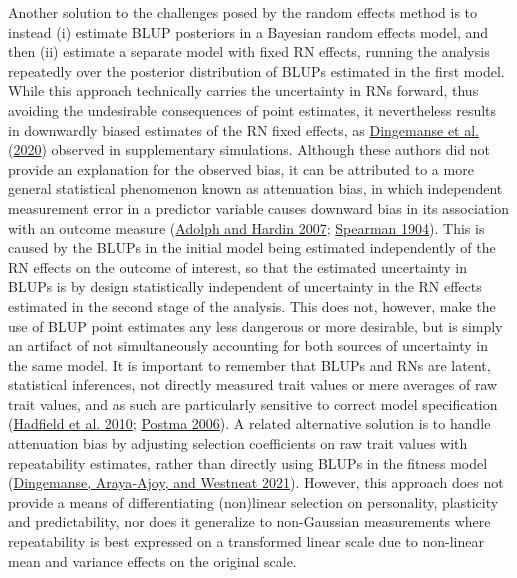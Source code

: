 \documentclass{article}
\begin{document}
Another solution to the challenges posed by the random effects method is
to instead (i) estimate BLUP posteriors in a Bayesian random effects
model, and then (ii) estimate a separate model with fixed RN effects,
running the analysis repeatedly over the posterior distribution of BLUPs
estimated in the first model. While this approach technically carries
the uncertainty in RNs forward, thus avoiding the undesirable
consequences of point estimates, it nevertheless results in downwardly
biased estimates of the RN fixed effects, as
\protect\hyperlink{ref-Ding2020b}{Dingemanse et al.}
(\protect\hyperlink{ref-Ding2020b}{2020}) observed in supplementary
simulations. Although these authors did not provide an explanation for
the observed bias, it can be attributed to a more general statistical
phenomenon known as attenuation bias, in which independent measurement
error in a predictor variable causes downward bias in its association
with an outcome measure (\protect\hyperlink{ref-Adolf2007}{Adolph and
Hardin 2007}; \protect\hyperlink{ref-Spearman1904}{Spearman 1904}). This
is caused by the BLUPs in the initial model being estimated
independently of the RN effects on the outcome of interest, so that the
estimated uncertainty in BLUPs is by design statistically independent of
uncertainty in the RN effects estimated in the second stage of the
analysis. This does not, however, make the use of BLUP point estimates
any less dangerous or more desirable, but is simply an artifact of not
simultaneously accounting for both sources of uncertainty in the same
model. It is important to remember that BLUPs and RNs are latent,
statistical inferences, not directly measured trait values or mere
averages of raw trait values, and as such are particularly sensitive to
correct model specification
(\protect\hyperlink{ref-Hadfield2010}{Hadfield et al. 2010};
\protect\hyperlink{ref-Postma2006}{Postma 2006}). A related alternative
solution is to handle attenuation bias by adjusting selection
coefficients on raw trait values with repeatability estimates, rather
than directly using BLUPs in the fitness model
(\protect\hyperlink{ref-Ding2021}{Dingemanse, Araya‐Ajoy, and Westneat
2021}). However, this approach does not provide a means of
differentiating (non)linear selection on personality, plasticity and
predictability, nor does it generalize to non-Gaussian measurements
where repeatability is best expressed on a transformed linear scale due
to non-linear mean and variance effects on the original scale.
\end{document}

